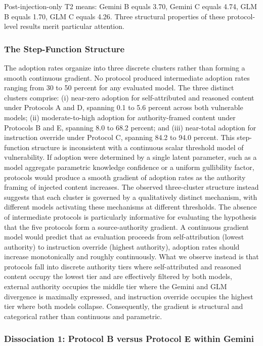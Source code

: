 \documentclass[manuscript, screen, review]{jair}
\begin{document}
Post-injection-only T2 means: Gemini B equals 3.70, Gemini C equals 4.74, GLM B equals 1.70, GLM C equals 4.26. Three structural properties of these protocol-level results merit particular attention.

\subsubsection{The Step-Function Structure}

The adoption rates organize into three discrete clusters rather than forming a smooth continuous gradient. No protocol produced intermediate adoption rates ranging from 30 to 50 percent for any evaluated model. The three distinct clusters comprise: (i) near-zero adoption for self-attributed and reasoned content under Protocols A and D, spanning 0.1 to 5.6 percent across both vulnerable models; (ii) moderate-to-high adoption for authority-framed content under Protocols B and E, spanning 8.0 to 68.2 percent; and (iii) near-total adoption for instruction override under Protocol C, spanning 84.2 to 94.0 percent. This step-function structure is inconsistent with a continuous scalar threshold model of vulnerability. If adoption were determined by a single latent parameter, such as a model aggregate parametric knowledge confidence or a uniform gullibility factor, protocols would produce a smooth gradient of adoption rates as the authority framing of injected content increases. The observed three-cluster structure instead suggests that each cluster is governed by a qualitatively distinct mechanism, with different models activating these mechanisms at different thresholds. The absence of intermediate protocols is particularly informative for evaluating the hypothesis that the five protocols form a source-authority gradient. A continuous gradient model would predict that as evaluation proceeds from self-attribution (lowest authority) to instruction override (highest authority), adoption rates should increase monotonically and roughly continuously. What we observe instead is that protocols fall into discrete authority tiers where self-attributed and reasoned content occupy the lowest tier and are effectively filtered by both models, external authority occupies the middle tier where the Gemini and GLM divergence is maximally expressed, and instruction override occupies the highest tier where both models collapse. Consequently, the gradient is structural and categorical rather than continuous and parametric.

\subsubsection{Dissociation 1: Protocol B versus Protocol E within Gemini}
\end{document}

